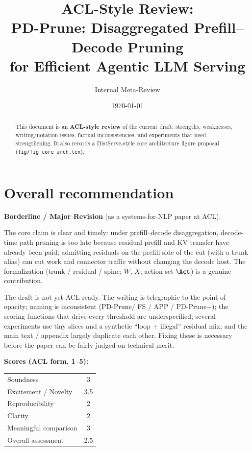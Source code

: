 \documentclass[11pt]{article}
\title{ACL-Style Review:\\
PD-Prune: Disaggregated Prefill--Decode Pruning\\
for Efficient Agentic LLM Serving}
\author{Internal Meta-Review}
\date{\today}
\newcommand{\sys}{\textsf{PD-Prune}\xspace}
\newcommand{\plus}{\textsf{PD-Prune+}}
\newcommand{\Work}{W}
\newcommand{\Xfer}{X}
\begin{document}
\maketitle

\begin{abstract}
This document is an \textbf{ACL-style review} of the current draft: strengths,
weaknesses, writing/notation issues, factual inconsistencies, and experiments
that need strengthening. It also records a DistServe-style core architecture
figure proposal (\texttt{fig/fig\_core\_arch.tex}).
\end{abstract}

\section*{Overall recommendation}
\textbf{Borderline / Major Revision} (as a systems-for-NLP paper at ACL).

The core claim is clear and timely: under prefill--decode disaggregation,
decode-time path pruning is too late because residual prefill and KV transfer
have already been paid; admitting residuals on the prefill side of the cut
(with a trunk alias) can cut work and connector traffic without changing the
decode host. The formalization (trunk / residual / spine; $\Work$, $\Xfer$;
action set $\Act$) is a genuine contribution.

The draft is not yet ACL-ready. The writing is telegraphic to the point of
opacity; naming is inconsistent (\sys / FS / \textsf{APP} / \plus); the scoring
functions that drive every threshold are underspecified; several experiments
use tiny slices and a synthetic ``loop + illegal'' residual mix; and the main
text / appendix largely duplicate each other. Fixing these is necessary before
the paper can be fairly judged on technical merit.

\medskip
\noindent\textbf{Scores (ACL form, 1--5):}
\begin{center}
\small
\begin{tabular}{@{}lc@{}}
\toprule
Soundness & 3 \\
Excitement / Novelty & 3.5 \\
Reproducibility & 2 \\
Clarity & 2 \\
Meaningful comparison & 3 \\
Overall assessment & 2.5 \\
\bottomrule
\end{tabular}
\end{center}
\end{document}
